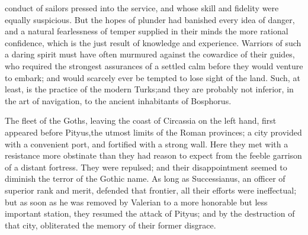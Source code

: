 conduct of sailors pressed into the service, and whose skill and
fidelity were equally suspicious. But the hopes of plunder had
banished every idea of danger, and a natural fearlessness of
temper supplied in their minds the more rational confidence,
which is the just result of knowledge and experience. Warriors of
such a daring spirit must have often murmured against the
cowardice of their guides, who required the strongest assurances
of a settled calm before they would venture to embark; and would
scarcely ever be tempted to lose sight of the land. Such, at
least, is the practice of the modern Turks;\footnotemark[104] and they are
probably not inferior, in the art of navigation, to the ancient
inhabitants of Bosphorus.











The fleet of the Goths, leaving the coast of Circassia on the
left hand, first appeared before Pityus,\footnotemark[105] the utmost limits of
the Roman provinces; a city provided with a convenient port, and
fortified with a strong wall. Here they met with a resistance
more obstinate than they had reason to expect from the feeble
garrison of a distant fortress. They were repulsed; and their
disappointment seemed to diminish the terror of the Gothic name.
As long as Successianus, an officer of superior rank and merit,
defended that frontier, all their efforts were ineffectual; but
as soon as he was removed by Valerian to a more honorable but
less important station, they resumed the attack of Pityus; and by
the destruction of that city, obliterated the memory of their
former disgrace.\footnotemark[106]

